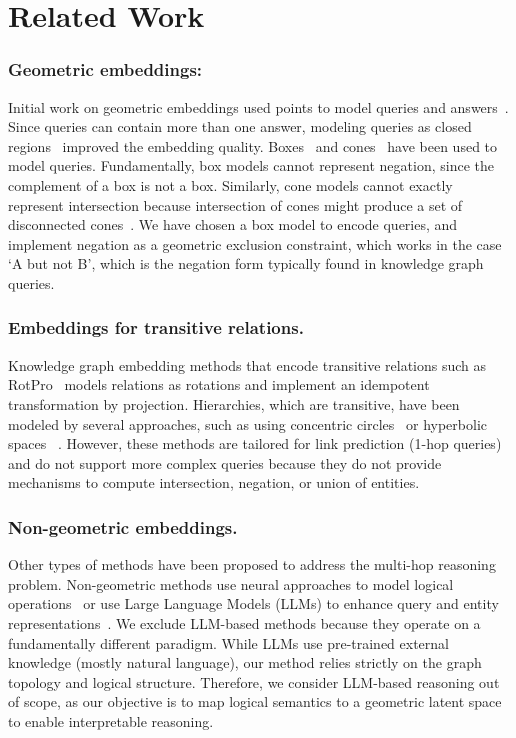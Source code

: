 \documentclass[runningheads]{llncs}
\renewcommand{\paragraph}[1]{\subsubsection{#1}}
\begin{document}
\section{Related Work}

\paragraph{Geometric embeddings:} Initial work on geometric embeddings
used points to model queries and answers~\cite{gqe}. Since queries can
contain more than one answer, modeling queries as closed
regions~\cite{query2box,cone,acone} improved the embedding quality.
Boxes~\cite{query2box} and cones~\cite{cone,acone} have been used to
model queries. Fundamentally, box models cannot represent negation,
since the complement of a box is not a box. Similarly, cone models
cannot exactly represent intersection because intersection of cones
might produce a set of disconnected cones~\cite{acone}. We have chosen
a box model to encode queries, and implement negation as a geometric
exclusion constraint, which works in the case `A but not B', which is
the negation form typically found in knowledge graph queries.

\paragraph{Embeddings for transitive relations.} Knowledge graph
embedding methods that encode transitive relations such as
RotPro~\cite{rotpro} models relations as rotations and implement an
idempotent transformation by projection.  Hierarchies, which are
transitive, have been modeled by several approaches, such as using
concentric circles~\cite{hake} or hyperbolic spaces
~\cite{nickel2017poincare}. However, these methods are tailored for
link prediction (1-hop queries) and do not support more complex
queries because they do not provide mechanisms to compute
intersection, negation, or union of entities.


\paragraph{Non-geometric embeddings.} Other types of methods have been
proposed to address the multi-hop reasoning problem. Non-geometric
methods use neural approaches to model logical
operations~\cite{long-etal-2022-neural} or use Large Language Models
(LLMs) to enhance query and entity representations~\cite{Phan_2025}.
We exclude LLM-based methods because they operate on a fundamentally
different paradigm. While LLMs use pre-trained external knowledge
(mostly natural language), our method relies strictly on the graph
topology and logical structure. Therefore, we consider LLM-based
reasoning out of scope, as our objective is to map logical semantics
to a geometric latent space to enable interpretable reasoning.
\end{document}
